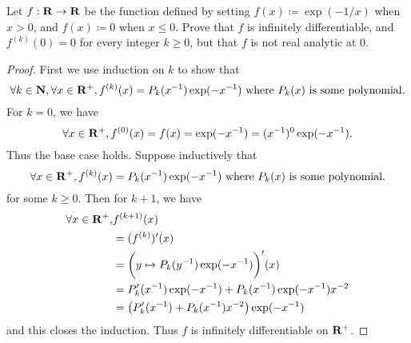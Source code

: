 \begin{exercise}\label{ex 4.5.4}
  Let \(f : \mathbf{R} \to \mathbf{R}\) be the function defined by setting \(f(x) \coloneqq \exp(-1 / x)\) when \(x > 0\), and \(f(x) \coloneqq 0\) when \(x \leq 0\).
  Prove that \(f\) is infinitely differentiable, and \(f^{(k)}(0) = 0\) for every integer \(k \geq 0\), but that \(f\) is not real analytic at \(0\).
\end{exercise}

\begin{proof}
  First we use induction on \(k\) to show that
  \[
    \forall k \in \mathbf{N}, \forall x \in \mathbf{R}^+, f^{(k)}(x) = P_k(x^{-1}) \exp(-x^{-1}) \text{ where } P_k(x) \text{ is some polynomial}.
  \]
  For \(k = 0\), we have
  \[
    \forall x \in \mathbf{R}^+, f^{(0)}(x) = f(x) = \exp(-x^{-1}) = (x^{-1})^0 \exp(-x^{-1}).
  \]
  Thus the base case holds.
  Suppose inductively that
  \[
    \forall x \in \mathbf{R}^+, f^{(k)}(x) = P_k(x^{-1}) \exp(-x^{-1}) \text{ where } P_k(x) \text{ is some polynomial}.
  \]
  for some \(k \geq 0\).
  Then for \(k + 1\), we have
  \begin{align*}
    \forall x \in \mathbf{R}^+, & f^{(k + 1)}(x)                                                  \\
                        & = (f^{(k)})'(x)                                                 \\
                        & = \bigg(y \mapsto P_k(y^{-1}) \exp(-x^{-1})\bigg)'(x)           \\
                        & = P_k'(x^{-1}) \exp(-x^{-1}) + P_k(x^{-1}) \exp(-x^{-1}) x^{-2} \\
                        & = \big(P_k'(x^{-1}) + P_k(x^{-1}) x^{-2}\big) \exp(-x^{-1})
  \end{align*}
  and this closes the induction.
  Thus \(f\) is infinitely differentiable on \(\mathbf{R}^+\).


\end{proof}
